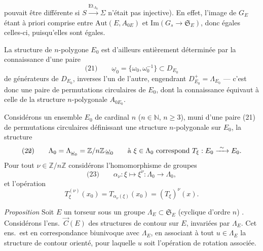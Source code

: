 \documentclass[11pt,a4paper]{article}
\begin{document}
pouvait être différente si $S \xrightarrow{\mathrm{Et}_{A_0}} \Sigma$ n'était pas
injective). En effet, l'image de $G_E$ étant à priori comprise entre
$\mathrm{Aut}(E, A_{0E})$ et $\mathrm{Im}(G_s \to \mathfrak{S}_E)$, donc égales
 celles-ci, puisqu'elles sont égales.

La structure de $n$-polygone   $E_0$ est d'ailleurs
entièrement déterminée par la connaissance d'une paire
\[
\text{(21)} \qquad \underline{\omega}_0 = \{ \omega_0 , \omega_0^{-1} \} \subset D_{E_0}
\]
de générateurs de $D_{E_0}$,  inverses l'un de l'autre,
engendrant $D_{E_0}^{+} = \Lambda_{E_0}$ — c'est donc une paire de permutations
circulaires de $E_0$, dont la connaissance équivaut à celle de la structure
$n$-polygonale $A_{0E_0}$.

 Considérons un ensemble $E_0$ de cardinal $n$
($n \in \mathbb{N}$, $n \geq 3$), muni d'une paire (21) de permutations
circulaires définissant une structure $n$-polygonale sur $E_0$,
  la structure \ill{} 
\[
\text{(2\struck{2})} \qquad \Lambda_0 = \Lambda_{\underline{\omega}_0} = \mathbb{Z}/n\mathbb{Z}\, \underline{\omega}_0
\qquad \text{à } \xi \in \Lambda_0 \text{ correspond } T_\xi : E_0 \xrightarrow{\ \sim\ } E_0 .
\]
 Pour tout $\nu \in \mathbb{Z}/n\mathbb{Z}$
considérons l'homomorphisme de groupes
\[
\text{(23)} \qquad \alpha_\nu : \xi \longmapsto \xi^{\nu} : \Lambda_0 \longrightarrow \Lambda_0 ,
\]
 et l'opération 
\[
T^{(\nu)}_\xi (x_0) = T_{\alpha_\nu(\xi)}(x_0) = (T_\xi)^{\nu}(x) .
\]

 \emph{Proposition} Soit $E$ un torseur sous un groupe
$\Lambda_E \subset \mathfrak{S}_E$ (cyclique d'ordre $n$)
. Considérons l'ens.\
$\vec{C}(E)$ des structures de contour   sur
$E$, invariées par $\Lambda_E$. \struck{On a Pour tout Pour tout} Cet ens.\ est
en correspondance biunivoque avec $\Lambda_E$, en associant à tout
$u \in \Lambda_E$ la structure de contour orienté,  pour
laquelle $u$ soit l'opération de rotation \add{génératrice} associée.
\end{document}
